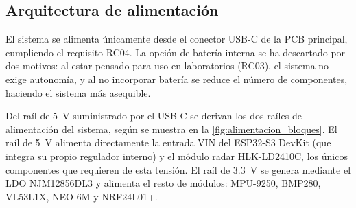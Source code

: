 \subsection{Arquitectura de alimentación}
\label{sec:alim_arquitectura}

El sistema se alimenta únicamente desde el conector USB-C de la PCB principal,
cumpliendo el requisito RC04. La opción de batería interna se ha
descartado por dos motivos: al estar pensado para uso en laboratorios (RC03), el sistema no
exige autonomía, y al no incorporar batería se reduce el número
de componentes, haciendo el sistema más asequible.

Del raíl de \SI{5}{\volt} suministrado por el USB-C se derivan los dos raíles
de alimentación del sistema, según se muestra en la
\cref{fig:alimentacion_bloques}. El raíl de \SI{5}{\volt} alimenta
directamente la entrada VIN del ESP32-S3 DevKit (que integra su propio
regulador interno) y el módulo radar HLK-LD2410C, los únicos componentes que
requieren de esta tensión. El raíl de \SI{3.3}{\volt} se genera mediante el LDO
NJM12856DL3 \cite{ds_njm12856} y alimenta el resto de módulos: MPU-9250,
BMP280, VL53L1X, NEO-6M y NRF24L01+.

